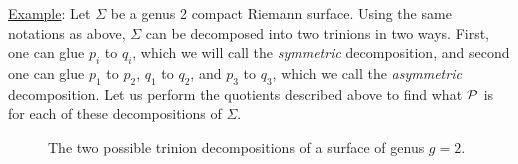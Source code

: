	\underline{Example}: Let $\Sigma$ be a genus 2 compact Riemann surface. Using the same notations as above, $\Sigma$ can be decomposed into two trinions in two ways. First, one can glue $p_i$ to $q_i$, which we will call the \emph{symmetric} decomposition, and second one can glue $p_1$ to $p_2$, $q_1$ to $q_2$, and $p_3$ to $q_3$, which we call the \emph{asymmetric} decomposition. Let us perform the quotients described above to find what $\mathcal{P}$ is for each of these decompositions of $\Sigma$. 
	
	\begin{figure}[h]
		\centering
		\label{fig:g2decomps}
		\caption{The two possible trinion decompositions of a surface of genus $g=2$.}
	\end{figure}
	

